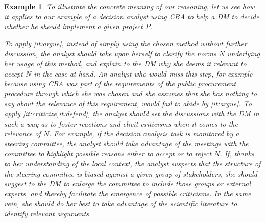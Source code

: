 \documentclass[preprint, french, english, 11pt, authoryear]{elsarticle}%
\newtheorem{example}{Example}
\begin{document}
\begin{example}
To illustrate the concrete meaning of our reasoning, let us see how it applies to our example of a decision analyst using \ac{CBA} to help a \ac{DM} to decide whether he should implement a given project $P$.

To apply \cref{it:argue}, instead of simply using the chosen method without further discussion, the analyst should take upon herself to clarify the norms $N$ underlying her usage of this method, and explain to the \ac{DM} why she deems it relevant to accept $N$ in the case at hand.
An analyst who would miss this step, for example because using \ac{CBA} was part of the requirements of the public procurement procedure through which she was chosen and she assumes that she has nothing to say about the relevance of this requirement, would fail to abide by \cref{it:argue}.
To apply \cref{it:criticize,it:defend}, the analyst should set the discussions with the \ac{DM} in such a way as to foster reactions and elicit criticisms when it comes to the relevance of $N$.
For example, if the decision analysis task is monitored by a steering committee, the analyst should take advantage of the meetings with the committee to highlight possible reasons either to accept or to reject $N$.
If, thanks to her understanding of the local context, the analyst suspects that the structure of the steering committee is biased against a given group of stakeholders, she should suggest to the \ac{DM} to enlarge the committee to include those groups or external experts, 
and thereby facilitate the emergence of possible criticisms.
In the same vein, she should do her best to take advantage of the scientific literature to identify relevant arguments.  




\end{example}
\end{document}
